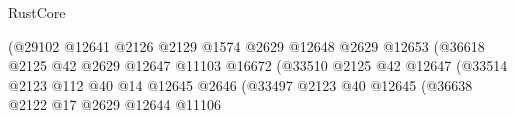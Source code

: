 \begin{lexlean}{RustCore}
\begin{coremodule}
                                                            (@29102
                                                              @12641
                                                              @2126
                                                              @2129
                                                              @1574
                                                              @2629
                                                              @12648
                                                              @2629
                                                              @12653
                                                              (@36618
                                                                @2125
                                                                @42
                                                                @2629
                                                                @12647
                                                                @11103
                                                                @16672
                                                                (@33510
                                                                  @2125
                                                                  @42
                                                                  @12647
                                                                  (@33514
                                                                    @2123
                                                                    @112
                                                                    @40
                                                                    @14
                                                                    @12645
                                                                    @2646
                                                                    (@33497
                                                                      @2123
                                                                      @40
                                                                      @12645
                                                                      (@36638
                                                                        @2122
                                                                        @17
                                                                        @2629
                                                                        @12644
                                                                        @11106

\end{coremodule}
\end{lexlean}
